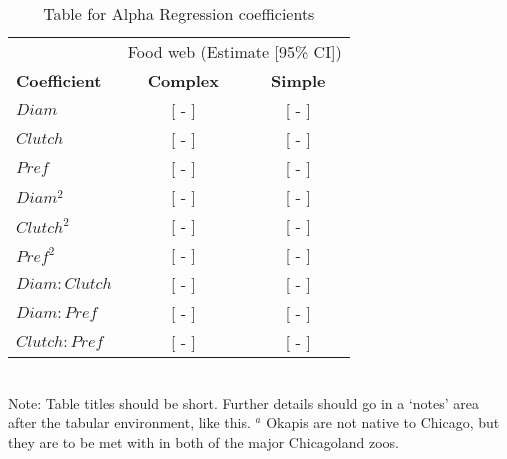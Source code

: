 \documentclass[11pt]{article}
\begin{document}
\begin{table}[h]
\caption{Table for Alpha Regression coefficients}
\label{Table:Alphas}
\centering
\begin{tabular}{lcc}
                                                                           \\ \hline
                       & \multicolumn{2}{c}{Food web (Estimate [95\% CI])} \\
\textbf{Coefficient}   & \textbf{Complex} & \textbf{Simple}                \\ \hline
$Diam$                 &  [ - ] &  [ - ] \\
$Clutch$               &  [ - ] &  [ - ] \\
$Pref$                 &  [ - ] &  [ - ] \\
$Diam^2$               &  [ - ] &  [ - ] \\
$Clutch^2$             &  [ - ] &  [ - ] \\
$Pref^2$               &  [ - ] &  [ - ] \\
$Diam:Clutch$          &  [ - ] &  [ - ] \\
$Diam:Pref$            &  [ - ] &  [ - ] \\
$Clutch:Pref$          &  [ - ] &  [ - ]              \\ \hline
\end{tabular}
\bigskip{}
\\
{\footnotesize Note: Table titles should be short. Further details should go in a `notes' area after the tabular environment, like this. $^a$ Okapis are not native to Chicago, but they are to be met with in both of the major Chicagoland zoos.}
\end{table}

\newpage{}
\end{document}
